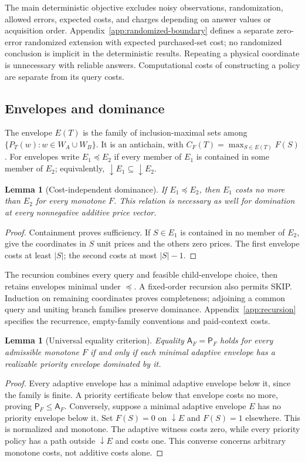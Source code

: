 \documentclass[pdflatex,sn-mathphys-num]{sn-jnl}
\newcommand{\A}{\mathsf{A}}
\newcommand{\Pcost}{\mathsf{P}}
\newcommand{\down}{\mathop{\downarrow}}
\theoremstyle{thmstyleone}
\newtheorem{lemma}[theorem]{Lemma}
\theoremstyle{thmstylethree}
\theoremstyle{thmstyletwo}
\begin{document}
The main deterministic objective excludes noisy observations, randomization, allowed errors, expected costs, and charges depending on answer values or acquisition order. Appendix~\ref{app:randomized-boundary} defines a separate zero-error randomized extension with expected purchased-set cost; no randomized conclusion is implicit in the deterministic results. Repeating a physical coordinate is unnecessary with reliable answers. Computational costs of constructing a policy are separate from its query costs.

\subsection{Envelopes and dominance}\label{sec:envelopes}
The envelope $E(T)$ is the family of inclusion-maximal sets among $\{P_T(w):w\in W_A\cup W_B\}$. It is an antichain, with $C_F(T)=\max_{S\in E(T)}F(S)$. For envelopes write $E_1\preceq E_2$ if every member of $E_1$ is contained in some member of $E_2$; equivalently, $\down E_1\subseteq\down E_2$.

\begin{lemma}[Cost-independent dominance]\label{lem:dominance}
If $E_1\preceq E_2$, then $E_1$ costs no more than $E_2$ for every monotone $F$. This relation is necessary as well for domination at every nonnegative additive price vector.
\end{lemma}
\begin{proof}
Containment proves sufficiency. If $S\in E_1$ is contained in no member of $E_2$, give the coordinates in $S$ unit prices and the others zero prices. The first envelope costs at least $|S|$; the second costs at most $|S|-1$.
\end{proof}

The recursion combines every query and feasible child-envelope choice, then retains envelopes minimal under $\preceq$. A fixed-order recursion also permits SKIP. Induction on remaining coordinates proves completeness; adjoining a common query and uniting branch families preserve dominance. Appendix~\ref{app:recursion} specifies the recurrence, empty-family conventions and paid-context costs.

\begin{lemma}[Universal equality criterion]\label{lem:criterion}
Equality $\A_F=\Pcost_F$ holds for every admissible monotone $F$ if and only if each minimal adaptive envelope has a realizable priority envelope dominated by it.
\end{lemma}
\begin{proof}
Every adaptive envelope has a minimal adaptive envelope below it, since the family is finite. A priority certificate below that envelope costs no more, proving $\Pcost_F\leq\A_F$. Conversely, suppose a minimal adaptive envelope $E$ has no priority envelope below it. Set $F(S)=0$ on $\down E$ and $F(S)=1$ elsewhere. This is normalized and monotone. The adaptive witness costs zero, while every priority policy has a path outside $\down E$ and costs one. This converse concerns arbitrary monotone costs, not additive costs alone.
\end{proof}
\end{document}
